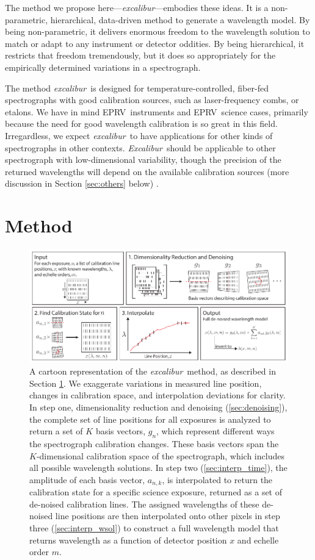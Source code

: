 \documentclass[twocolumn,table,xcolor,trackchanges]{aastex63}
\newcommand{\project}[1]{\textsl{#1}}
\newcommand{\name}{\project{excalibur}}
\newcommand{\Name}{\project{Excalibur}}
\newcommand{\acronym}[1]{{\small{#1}}}
\newcommand{\eprv}{\acronym{EPRV}}
\begin{document}
The method we propose here---\name---embodies these ideas.
It is a non-parametric, hierarchical, data-driven method to generate a wavelength model.  By being non-parametric, it delivers enormous freedom to the wavelength solution to match or adapt to any instrument or detector oddities.  By being hierarchical, it restricts that freedom tremendously, but it does so appropriately for the empirically determined variations in a spectrograph.

The method \name\ is designed for temperature-controlled, fiber-fed spectrographs with good calibration sources, such as laser-frequency combs, or etalons.  We have in mind \eprv\ instruments and \eprv\ science cases, primarily because the need for good wavelength calibration is so great in this field.  Irregardless, we expect \name\ to have applications for other kinds of spectrographs in other contexts.  \Name\ should be applicable to other spectrograph with low-dimensional variability, though the precision of the returned wavelengths will depend on the available calibration sources (more discussion in Section \ref{sec:others} below) .


\section{Method} \label{sec:method}
\begin{figure}[t]
\centering
\includegraphics[width=\textwidth]{Figures/methodCartoon.pdf}
\caption{A cartoon representation of the \name\ method, as described in Section \ref{sec:method}.  We exaggerate variations in measured line position, changes in calibration space, and interpolation deviations for clarity.  In step one, dimensionality reduction and denoising (\textsection \ref{sec:denoising}), the complete set of line positions for all exposures is analyzed to return a set of $K$ basis vectors, $g_n$, which represent different ways the spectrograph calibration changes.  These basis vectors span the $K$-dimensional calibration space of the spectrograph, which includes all possible wavelength solutions.  In step two (\textsection \ref{sec:interp_time}), the amplitude of each basis vector, $a_{n,k}$, is interpolated to return the calibration state for a specific science exposure, returned as a set of de-noised calibration lines.  The assigned wavelengths of these de-noised line positions are then interpolated onto other pixels in step three (\textsection \ref{sec:interp_wsol}) to construct a full wavelength model that returns wavelength as a function of detector position $x$ and echelle order $m$.}
\label{fig:cartoon}
\end{figure} 
\end{document}
